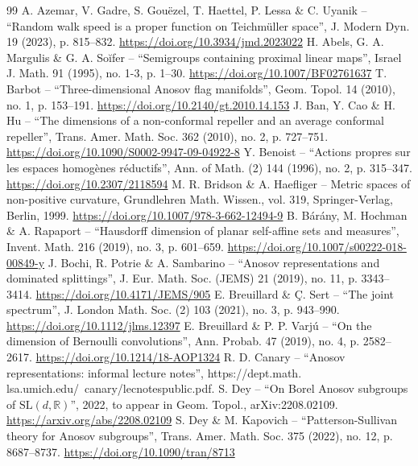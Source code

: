 \documentclass[10pt,a4paper]{amsart}
\begin{document}
\begin{thebibliography}{99}
 A. Azemar, V. Gadre, S. Gouëzel, T. Haettel, P. Lessa \& C. Uyanik – “Random walk speed is a proper function on Teichmüller space”, J. Modern Dyn. 19 (2023), p. 815–832. \url{https://doi.org/10.3934/jmd.2023022}
 H. Abels, G. A. Margulis \& G. A. Soĭfer – “Semigroups containing proximal linear maps”, Israel J. Math. 91 (1995), no. 1-3, p. 1–30. \url{https://doi.org/10.1007/BF02761637}
 T. Barbot – “Three-dimensional Anosov flag manifolds”, Geom. Topol. 14 (2010), no. 1, p. 153–191. \url{https://doi.org/10.2140/gt.2010.14.153}
 J. Ban, Y. Cao \& H. Hu – “The dimensions of a non-conformal repeller and an average conformal repeller”, Trans. Amer. Math. Soc. 362 (2010), no. 2, p. 727–751. \url{https://doi.org/10.1090/S0002-9947-09-04922-8}
 Y. Benoist – “Actions propres sur les espaces homogènes réductifs”, Ann. of Math. (2) 144 (1996), no. 2, p. 315–347. \url{https://doi.org/10.2307/2118594}
 M. R. Bridson \& A. Haefliger – Metric spaces of non-positive curvature, Grundlehren Math. Wissen., vol. 319, Springer-Verlag, Berlin, 1999. \url{https://doi.org/10.1007/978-3-662-12494-9}
 B. Bárány, M. Hochman \& A. Rapaport – “Hausdorff dimension of planar self-affine sets and measures”, Invent. Math. 216 (2019), no. 3, p. 601–659. \url{https://doi.org/10.1007/s00222-018-00849-y}
 J. Bochi, R. Potrie \& A. Sambarino – “Anosov representations and dominated splittings”, J. Eur. Math. Soc. (JEMS) 21 (2019), no. 11, p. 3343–3414. \url{https://doi.org/10.4171/JEMS/905}
 E. Breuillard \& Ç. Sert – “The joint spectrum”, J. London Math. Soc. (2) 103 (2021), no. 3, p. 943–990. \url{https://doi.org/10.1112/jlms.12397}
 E. Breuillard \& P. P. Varjú – “On the dimension of Bernoulli convolutions”, Ann. Probab. 47 (2019), no. 4, p. 2582–2617. \url{https://doi.org/10.1214/18-AOP1324}
 R. D. Canary – “Anosov representations: informal lecture notes”, https://dept.math. lsa.umich.edu/~canary/lecnotespublic.pdf. 
 S. Dey – “On Borel Anosov subgroups of $\mathrm{SL}(d, \mathbb{R})$”, 2022, to appear in Geom. Topol., arXiv:2208.02109. \url{https://arxiv.org/abs/2208.02109}
 S. Dey \& M. Kapovich – “Patterson-Sullivan theory for Anosov subgroups”, Trans. Amer. Math. Soc. 375 (2022), no. 12, p. 8687–8737. \url{https://doi.org/10.1090/tran/8713}

\end{thebibliography}
\end{document}
